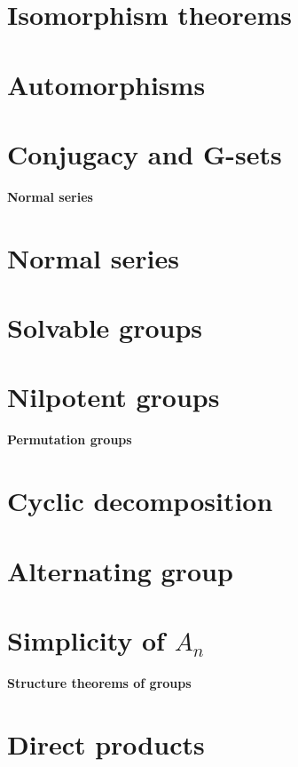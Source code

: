 \documentclass[twocolumn]{article}
\begin{document}
\section{Isomorphism theorems}
\setcounter{defi}{0}
\setcounter{teo}{0}
\setcounter{coro}{0}


\section{Automorphisms}
\setcounter{defi}{0}
\setcounter{teo}{0}
\setcounter{coro}{0}


\section{Conjugacy and G-sets}
\setcounter{defi}{0}
\setcounter{teo}{0}
\setcounter{coro}{0}

\textbf{\Huge Normal series}
\section{Normal series}

\section{Solvable groups}

\section{Nilpotent groups}


\textbf{\huge Permutation groups}
\section{Cyclic decomposition}

\section{Alternating group}

\section{Simplicity of $A_n$}

\textbf{\huge Structure theorems of groups}
\section{Direct products}
\end{document}
